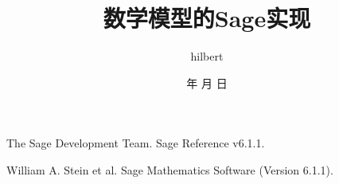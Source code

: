\documentclass{article}
\begin{document}
\begin{CJK*}{UTF8}{gbsn}

\setlength{\parindent}{2em}
\renewcommand{\today}{\number\year 年 \number\month 月 \number\day 日}
\renewcommand{\contentsname}{目录}
\renewcommand{\refname}{参考文献}

\title{数学模型的Sage实现}
\author{hilbert}
\date{\today}
\maketitle
\tableofcontents
\newpage
\newpage


\newpage

\newpage

\newpage

\newpage

\newpage

\newpage

\newpage

\newpage

\newpage

\newpage

\newpage

\newpage

\newpage

\newpage

\newpage

\newpage

\newpage

\newpage

\newpage

\newpage

\newpage

\newpage

\newpage

\newpage

\newpage

\newpage

\newpage

\newpage

\newpage

\newpage

\begin{thebibliography}{99}

 The Sage Development Team.
\newblock Sage Reference v6.1.1.

 William A. Stein et al.
\newblock Sage Mathematics Software (Version 6.1.1).

\end{thebibliography}

\end{CJK*}
\end{document}
